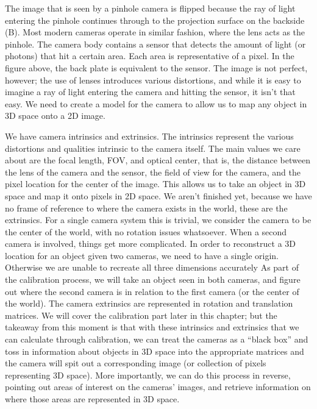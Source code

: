 \documentclass[12pt,twoside]{reedthesis}
\begin{document}
The image that is seen by a pinhole camera is flipped because the ray of light entering the pinhole continues through to the projection surface on the backside (B). Most modern cameras operate in similar fashion, where the lens acts as the pinhole. The camera body contains a sensor that detects the amount of light (or photons) that hit a certain area. Each area is representative of a pixel. In the figure above, the back plate is equivalent to the sensor. The image is not perfect, however; the use of lenses introduces various distortions, and while it is easy to imagine a ray of light entering the camera and hitting the sensor, it isn’t that easy. We need to create a model for the camera to allow us to map any object in 3D space onto a 2D image.

We have camera intrinsics and extrinsics. The intrinsics represent the various distortions and qualities intrinsic to the camera itself. The main values we care about are the focal length, FOV, and optical center, that is, the distance between the lens of the camera and the sensor, the field of view for the camera, and the pixel location for the center of the image. This allows us to take an object in 3D space and map it onto pixels in 2D space. We aren’t finished yet, because we have no frame of reference to where the camera exists in the world, these are the extrinsics. For a single camera system this is trivial, we consider the camera to be the center of the world, with no rotation issues whatsoever. When a second camera is involved, things get more complicated. In order to reconstruct a 3D location for an object given two cameras, we need to have a single origin. Otherwise we are unable to recreate all three dimensions accurately As part of the calibration process, we will take an object seen in both cameras, and figure out where the second camera is in relation to the first camera (or the center of the world). The camera extrinsics are represented in rotation and translation matrices. We will cover the calibration part later in this chapter; but the takeaway from this moment is that with these intrinsics and extrinsics that we can calculate through calibration, we can treat the cameras as a “black box” and toss in information about objects in 3D space into the appropriate matrices and the camera will spit out a corresponding image (or collection of pixels representing 3D space). More importantly, we can do this process in reverse, pointing out areas of interest on the cameras’ images, and retrieve information on where those areas are represented in 3D space.
\end{document}
